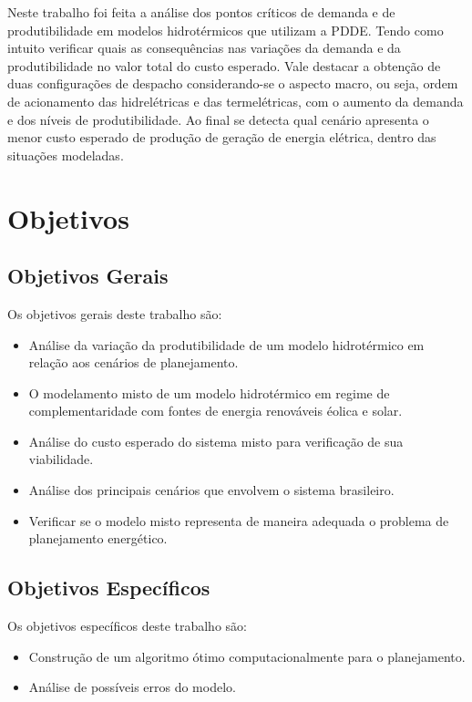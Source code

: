 Neste trabalho foi feita a an\'alise dos pontos cr\'iticos de demanda e de produtibilidade em modelos hidrot\'ermicos que utilizam a PDDE.
Tendo como intuito verificar quais as consequ\^encias nas varia\c c\~oes da demanda e da produtibilidade no valor total do custo esperado.
Vale destacar a obten\c c\~ao de duas configura\c c\~oes de despacho considerando-se o aspecto macro, ou seja, ordem de acionamento das 
hidrel\'etricas e das termel\'etricas, com o aumento da demanda e dos n\'iveis de produtibilidade.
Ao final se detecta qual cen\'ario apresenta o menor custo esperado de produ\c c\~ao de gera\c c\~ao de energia el\'etrica,
dentro das situa\c c\~oes modeladas.

 \section{Objetivos}
\subsection{Objetivos Gerais}
Os objetivos gerais deste trabalho s\~ao:
\begin{itemize}
	\item An\'alise da varia\c c\~ao da produtibilidade de um modelo hidrot\'ermico em rela\c c\~ao aos cen\'arios de
		planejamento. 
	\item O modelamento misto de um modelo hidrot\'ermico em regime de complementaridade com fontes de energia renov\'aveis \'eolica e solar.
	\item An\'alise do custo esperado do sistema misto para verifica\c c\~ao de sua viabilidade.
	\item An\'alise dos principais cen\'arios que envolvem o sistema brasileiro. 
	\item Verificar se o modelo misto representa de maneira adequada o problema de planejamento energ\'etico.
\end{itemize}

\subsection{Objetivos Espec\'ificos}
Os objetivos espec\'ificos deste trabalho s\~ao:
\begin{itemize}
	\item Constru\c c\~ao de um algoritmo \'otimo  computacionalmente para o planejamento. 
	\item An\'alise de poss\'iveis erros do modelo.
\end{itemize}
